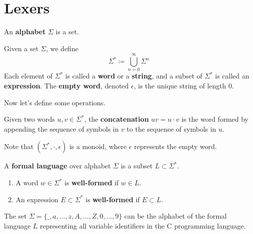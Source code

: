 \section{Lexers} 

  \begin{definition}[Alphabet]
    An \textbf{alphabet} $\Sigma$ is a set. 
  \end{definition}

  \begin{definition}
    Given a set $\Sigma$, we define
    \begin{equation}
      \Sigma^\ast \coloneqq \bigcup_{n=0}^\infty \Sigma^n
    \end{equation}
    Each element of $\Sigma^\ast$ is called a \textbf{word} or a \textbf{string}, and a subset of $\Sigma^\ast$ is called an \textbf{expression}. The \textbf{empty word}, denoted $\epsilon$, is the unique string of length $0$. 
  \end{definition}

  Now let's define some operations. 

  \begin{definition}[Concatenation]
    Given two words $u, v \in \Sigma^\ast$, the \textbf{concatenation} $uv = u \cdot v$ is the word formed by appending the sequence of symbols in $v$ to the sequence of symbols in $u$. 
  \end{definition}

  Note that $(\Sigma^\ast, \cdot, \epsilon)$ is a monoid, where $\epsilon$ represents the empty word. 

  \begin{definition}
    A \textbf{formal language} over alphabet $\Sigma$ is a subset $L \subset \Sigma^\ast$. 
    \begin{enumerate}
      \item A word $w \in \Sigma^\ast$ is \textbf{well-formed} if $w \in L$. 
      \item An expression $E \subset \Sigma^\ast$ is \textbf{well-formed} if $E \subset L$. 
    \end{enumerate}
  \end{definition}

  \begin{example}[C Identifiers]
    The set $\Sigma = \{\_, a, \ldots, z, A, \ldots, Z, 0, \ldots, 9\}$ can be the alphabet of the formal language $L$ representing all variable identifiers in the C programming language. 
  \end{example}

